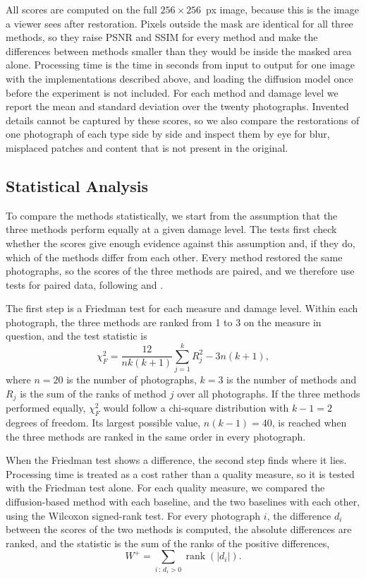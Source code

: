 \documentclass[conference]{IEEEtran}
\begin{document}
All scores are computed on the full $256 \times 256$~px image, because this is the image a viewer sees after restoration. Pixels outside the mask are identical for all three methods, so they raise PSNR and SSIM for every method and make the differences between methods smaller than they would be inside the masked area alone. Processing time is the time in seconds from input to output for one image with the implementations described above, and loading the diffusion model once before the experiment is not included. For each method and damage level we report the mean and standard deviation over the twenty photographs. Invented details cannot be captured by these scores, so we also compare the restorations of one photograph of each type side by side and inspect them by eye for blur, misplaced patches and content that is not present in the original.

\subsection*{Statistical Analysis}

To compare the methods statistically, we start from the assumption that the three methods perform equally at a given damage level. The tests first check whether the scores give enough evidence against this assumption and, if they do, which of the methods differ from each other. Every method restored the same photographs, so the scores of the three methods are paired, and we therefore use tests for paired data, following \cite{chung2026} and \cite{rainio2024}.

The first step is a Friedman test for each measure and damage level. Within each photograph, the three methods are ranked from 1 to 3 on the measure in question, and the test statistic is
\begin{equation}
  \chi^2_F = \frac{12}{n k (k+1)} \sum_{j=1}^{k} R_j^2 - 3n(k+1),
  \label{eq:friedman}
\end{equation}
where $n = 20$ is the number of photographs, $k = 3$ is the number of methods and $R_j$ is the sum of the ranks of method $j$ over all photographs. If the three methods performed equally, $\chi^2_F$ would follow a chi-square distribution with $k - 1 = 2$ degrees of freedom. Its largest possible value, $n(k - 1) = 40$, is reached when the three methods are ranked in the same order in every photograph.

When the Friedman test shows a difference, the second step finds where it lies. Processing time is treated as a cost rather than a quality measure, so it is tested with the Friedman test alone. For each quality measure, we compared the diffusion-based method with each baseline, and the two baselines with each other, using the Wilcoxon signed-rank test. For every photograph $i$, the difference $d_i$ between the scores of the two methods is computed, the absolute differences are ranked, and the statistic is the sum of the ranks of the positive differences,
\begin{equation}
  W^{+} = \sum_{i \,:\, d_i > 0} \operatorname{rank}\left(|d_i|\right).
  \label{eq:wilcoxon}
\end{equation}
\end{document}
